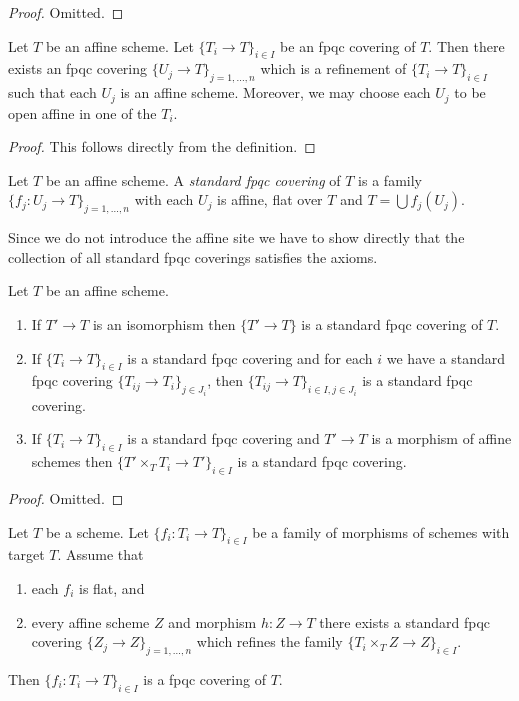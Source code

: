 \begin{proof}
Omitted.
\end{proof}

\begin{lemma}
\label{lemma-fpqc-affine}
Let $T$ be an affine scheme.
Let $\{T_i \to T\}_{i \in I}$ be an fpqc covering of $T$.
Then there exists an fpqc covering
$\{U_j \to T\}_{j = 1, \ldots, n}$ which is a refinement
of $\{T_i \to T\}_{i \in I}$ such that each $U_j$ is an affine
scheme. Moreover, we may choose each $U_j$ to be open affine
in one of the $T_i$.
\end{lemma}

\begin{proof}
This follows directly from the definition.
\end{proof}

\begin{definition}
\label{definition-standard-fpqc}
Let $T$ be an affine scheme. A {\it standard fpqc covering}
of $T$ is a family $\{f_j : U_j \to T\}_{j = 1, \ldots, n}$
with each $U_j$ is affine, flat over $T$ and $T = \bigcup f_j(U_j)$.
\end{definition}

\noindent
Since we do not introduce the affine site we have to show directly
that the collection of all standard fpqc coverings satisfies the
axioms.

\begin{lemma}
\label{lemma-fpqc-affine-axioms}
Let $T$ be an affine scheme.
\begin{enumerate}
\item If $T' \to T$ is an isomorphism then $\{T' \to T\}$
is a standard fpqc covering of $T$.
\item If $\{T_i \to T\}_{i\in I}$ is a standard fpqc covering and for each
$i$ we have a standard fpqc covering $\{T_{ij} \to T_i\}_{j\in J_i}$, then
$\{T_{ij} \to T\}_{i \in I, j\in J_i}$ is a standard fpqc covering.
\item If $\{T_i \to T\}_{i\in I}$ is a standard fpqc covering
and $T' \to T$ is a morphism of affine schemes then
$\{T' \times_T T_i \to T'\}_{i\in I}$ is a standard fpqc covering.
\end{enumerate}
\end{lemma}

\begin{proof}
Omitted.
\end{proof}

\begin{lemma}
\label{lemma-fpqc-covering-affines-mapping-in}
Let $T$ be a scheme. Let $\{f_i : T_i \to T\}_{i \in I}$ be a family of
morphisms of schemes with target $T$. Assume that
\begin{enumerate}
\item each $f_i$ is flat, and
\item every affine scheme
$Z$ and morphism $h : Z \to T$ there exists a standard fpqc covering
$\{Z_j \to Z\}_{j = 1, \ldots, n}$ which refines the family
$\{T_i \times_T Z \to Z\}_{i \in I}$.
\end{enumerate}
Then $\{f_i : T_i \to T\}_{i \in I}$ is a fpqc covering of $T$.
\end{lemma}


